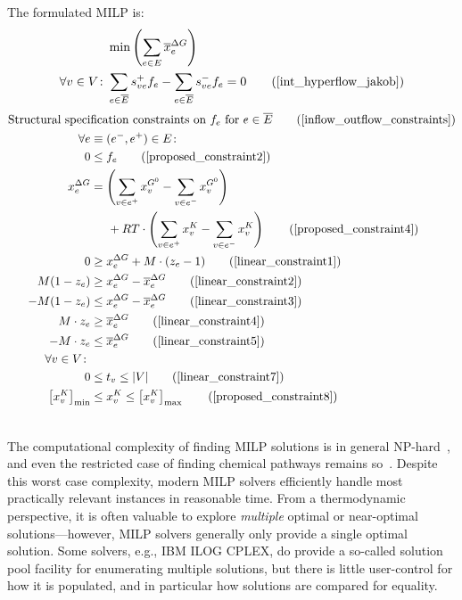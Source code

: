 The formulated MILP is:
\begin{align}
    & \min\left(\sum_{e \in E} \overline{x}^{\Delta G}_e \right) \label{obj_func_impl} \\    
    \forall v\in V\colon  & \sum_{ e\in \overline{E} } s_{ve}^+ f_e - \sum_{ e\in \overline{E} } s_{ve}^- f_e = 0 \tag{\ref{int_hyperflow_jakob}}
\end{align}
\begin{align}
    \text{Structural speci}&\text{fication constraints on $f_e$ for } e \in \overline{E} \tag{\ref{inflow_outflow_constraints}}\\
    \forall e&\equiv (e^-, e^+) \in E\colon \nonumber\\
    0 &\leq f_e  \tag{\ref{proposed_constraint2}} \\
    x^{\Delta G}_e &= \left(\sum_{v\in e^+} x^{G^0}_v - \sum_{v\in e^-} x^{G^0}_v\right) \nonumber\\
    & \hspace{0.5cm}+ RT\cdot \left(\sum_{v\in e^+} x^K_v - \sum_{v\in e^-} x^K_v\right) \tag{\ref{proposed_constraint4}} \\    
    0 &\geq x^{\Delta G}_e + M\cdot (z_e - 1) \tag{\ref{linear_constraint1}} \\
    M(1 - z_e) &\geq x^{\Delta G}_e - \overline{x}^{\Delta G}_e  \tag{\ref{linear_constraint2}} \\
    -M(1 - z_e) &\leq x^{\Delta G}_e - \overline{x}^{\Delta G}_e \tag{\ref{linear_constraint3}} \\
    M\cdot z_e &\geq \overline{x}^{\Delta G}_e \tag{\ref{linear_constraint4}} \\
    -M\cdot z_e &\leq \overline{x}^{\Delta G}_e \tag{\ref{linear_constraint5}} \\
    \forall v \in V\colon  & \nonumber\\
    0 &\leq t_v \leq |V| \tag{\ref{linear_constraint7}} \\
    \left[x^K_v\right]_{\text{min}} &\leq x^K_v \leq \left[x^K_v\right]_{\text{max}} \tag{\ref{proposed_constraint8}}\\\nonumber
\end{align}

The computational complexity of finding MILP solutions is in general NP-hard~\cite{Karp:72},
and even the restricted case of finding chemical pathways remains so~\cite{integer_hyperflow_np_hard}.
Despite this worst case complexity, modern MILP solvers efficiently handle most practically relevant instances in reasonable time.
From a thermodynamic perspective, it is often valuable to explore \emph{multiple} optimal or near-optimal solutions---however, MILP solvers generally only provide a single optimal solution.
Some solvers, e.g., IBM ILOG CPLEX, do provide a so-called solution pool facility for enumerating multiple solutions,
but there is little user-control for how it is populated, and in particular how solutions are compared for equality.

